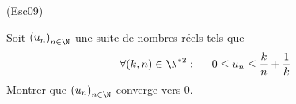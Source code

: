 \begin{tiny}(Esc09)\end{tiny} Soit $\left( u_n\right) _{n\in \N}$ une suite de nombres réels tels que 
\begin{displaymath}
 \forall(k,n)\in \N^{*2}:\hspace{0.5cm}
0\leq u_n \leq \frac{k}{n} + \frac{1}{k}
\end{displaymath}
Montrer que $\left( u_n\right) _{n\in \N}$ converge vers $0$.
